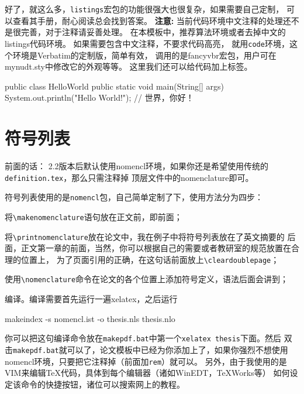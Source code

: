好了，就这么多，\texttt{listings}宏包的功能很强大也很复杂，如果需要自己定制，
可以查看其手册，耐心阅读总会找到答案。
\textbf{注意:} 当前代码环境中文注释的处理还不是很完善，对于注释请妥善处理。
在本模板中，推荐算法环境或者去掉中文的listings代码环境。
如果需要包含中文注释，不要求代码高亮，
就用\texttt{code}环境，这个环境是Verbatim的定制版，简单有效，
调用的是fancyvbr宏包，用户可在mynudt.sty中修改它的外观等等。
这里我们还可以给代码加上标签。
\begin{code}[label=hello.c]
public class HelloWorld {
   public static void main(String[] args) {
      System.out.println("Hello World!");
   }
}   // 世界，你好！
\end{code}

\section{符号列表}

{\hei 前面的话：}{\kai\color{blue} 
2.2版本后默认使用nomencl环境，如果你还是希望使用传统的\verb|definition.tex|，那么只需注释掉
顶层文件中的nomenclature即可。}

符号列表使用的是\verb|nomencl|包，自己简单定制了下，使用方法分为四步：
\begin{compactenum}
\item 将\verb|\makenomenclature|语句放在正文前，即\verb||前面；
\item 将\verb|\printnomenclature|放在论文中，我在例子中将符号列表放在了英文摘要的
后面，正文第一章的前面，当然，你可以根据自己的需要或者教研室的规范放置在合理的位置上，
为了页面引用的正确，在这句话前面放上\verb|\cleardoublepage|；
\item 使用\verb|\nomenclature|命令在论文的各个位置上添加符号定义，语法后面会讲到；
\item 编译。编译需要首先运行一遍xelatex，之后运行
\begin{code}
makeindex -s nomencl.ist -o thesis.nls thesis.nlo
\end{code}
\end{compactenum}

你可以把这句编译命令放在\verb|makepdf.bat|中第一个\verb|xelatex thesis|下面。然后
双击\verb|makepdf.bat|就可以了，论文模板中已经为你添加上了，如果你强烈不想使用
nomencl环境，只要把它注释掉（前面加\verb|rem|）就可以。
另外，由于我使用的是VIM来编辑\TeX{}代码，具体到每个编辑器（诸如WinEDT，TeXWorks等）
如何设定该命令的快捷按钮，诸位可以搜索网上的教程。

